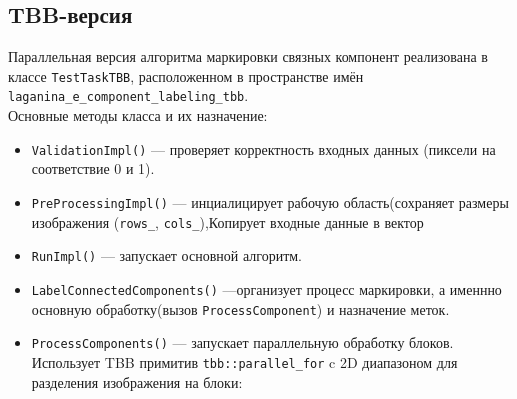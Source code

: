 \documentclass[12pt]{extarticle}
\begin{document}
\subsection{TBB-версия}

\hspace*{1.25cm} Параллельная версия алгоритма маркировки связных компонент реализована в классе \texttt{TestTaskTBB}, расположенном в пространстве имён \texttt{laganina\_e\_component\_labeling\_tbb}. \\[-0.2cm]

Основные методы класса и их назначение:
\begin{itemize}
    \item \texttt{ValidationImpl()} — проверяет корректность входных данных (пиксели на соответствие 0 и 1).
    \item \texttt{PreProcessingImpl()} — инциалицирует рабочую область(сохраняет размеры изображения (\texttt{rows\_}, \texttt{cols\_}),Копирует входные данные в вектор 
    \item \texttt{RunImpl()} — запускает основной алгоритм.
    \item \texttt{LabelConnectedComponents()} —организует процесс маркировки, а именнно  основную обработку(вызов \texttt{ProcessComponent}) и назначение меток.
    \item \texttt{ProcessComponents()} — запускает параллельную обработку блоков. Использует TBB примитив \texttt{tbb::parallel\_for} c 2D диапазоном для разделения изображения на блоки:


\end{itemize}
\end{document}

